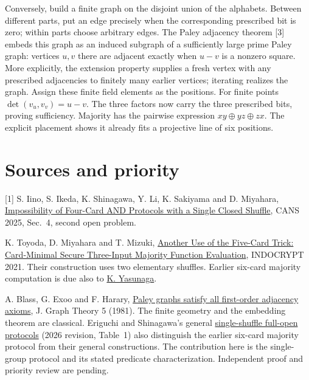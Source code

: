 \documentclass[11pt]{article}
\begin{document}
Conversely, build a finite graph on the disjoint union of the alphabets. Between different parts, put an edge precisely when the corresponding prescribed bit is zero; within parts choose arbitrary edges. The Paley adjacency theorem [3] embeds this graph as an induced subgraph of a sufficiently large prime Paley graph: vertices $u,v$ there are adjacent exactly when $u-v$ is a nonzero square. More explicitly, the extension property supplies a fresh vertex with any prescribed adjacencies to finitely many earlier vertices; iterating realizes the graph. Assign these finite field elements as the positions. For finite points $\det(v_u,v_v)=u-v$. The three factors now carry the three prescribed bits, proving sufficiency. Majority has the pairwise expression $xy\oplus yz\oplus zx$. The explicit placement shows it already fits a projective line of six positions.

\section*{Sources and priority}
[1] S. Iino, S. Ikeda, K. Shinagawa, Y. Li, K. Sakiyama and D. Miyahara, \href{https://daikimiyahara.github.io/pdf/cans2025.pdf}{Impossibility of Four-Card AND Protocols with a Single Closed Shuffle}, CANS 2025, Sec.~4, second open problem.\par
[2] K. Toyoda, D. Miyahara and T. Mizuki, \href{https://www.tains.tohoku.ac.jp/netlab/mizuki/conf/card3maj_indocrypt2021_web.pdf}{Another Use of the Five-Card Trick: Card-Minimal Secure Three-Input Majority Function Evaluation}, INDOCRYPT 2021. Their construction uses two elementary shuffles. Earlier six-card majority computation is due also to \href{https://doi.org/10.1587/transfun.2020EAL2025}{K. Yasunaga}.\par
[3] A. Blass, G. Exoo and F. Harary, \href{https://doi.org/10.1002/jgt.3190050414}{Paley graphs satisfy all first-order adjacency axioms}, J. Graph Theory 5 (1981). The finite geometry and the embedding theorem are classical. Eriguchi and Shinagawa's general \href{https://arxiv.org/abs/2510.17308}{single-shuffle full-open protocols} (2026 revision, Table~1) also distinguish the earlier six-card majority protocol from their general constructions. The contribution here is the single-group protocol and its stated predicate characterization. Independent proof and priority review are pending.
\end{document}
